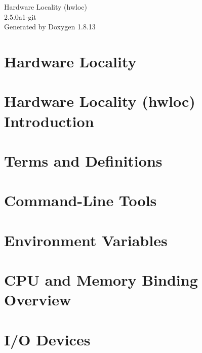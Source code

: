 \documentclass[twoside]{book}
\newcommand{\+}{\discretionary{\mbox{\scriptsize$\hookleftarrow$}}{}{}}
\newcommand{\clearemptydoublepage}{%
  \newpage{\pagestyle{empty}\cleardoublepage}%
}
\begin{document}
\hypersetup{pageanchor=false,
             bookmarksnumbered=true,
             pdfencoding=unicode
            }
\begin{titlepage}
\vspace*{7cm}
\begin{center}%
{\Large Hardware Locality (hwloc) \\[1ex]\large 2.\+5.\+0a1-\/git }\\
\vspace*{1cm}
{\large Generated by Doxygen 1.8.13}\\
\end{center}
\end{titlepage}
\clearemptydoublepage
{}
\tableofcontents
\clearemptydoublepage
{}
\hypersetup{pageanchor=true}

\chapter{Hardware Locality}
\label{index}\hypertarget{index}{}
\chapter{Hardware Locality (hwloc) Introduction}
\label{a00379}

\chapter{Terms and Definitions}
\label{a00380}

\chapter{Command-\/\+Line Tools}
\label{a00381}

\chapter{Environment Variables}
\label{a00382}

\chapter{C\+PU and Memory Binding Overview}
\label{a00383}

\chapter{I/O Devices}
\label{a00384}

\end{document}
